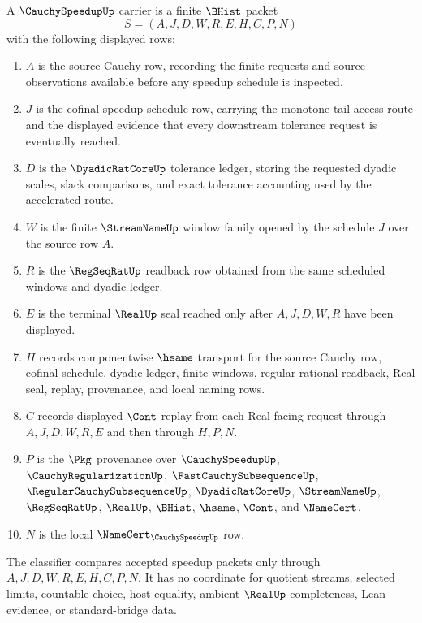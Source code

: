 \begin{definition}
\label{def:cauchy-speedup-carrier}
A $\CauchySpeedupUp$ carrier is a finite $\BHist$ packet
$$
S=(A,J,D,W,R,E,H,C,P,N)
$$
with the following displayed rows:
\begin{enumerate}
\item $A$ is the source Cauchy row, recording the finite requests and source observations available before any speedup schedule is inspected.
\item $J$ is the cofinal speedup schedule row, carrying the monotone tail-access route and the displayed evidence that every downstream tolerance request is eventually reached.
\item $D$ is the $\DyadicRatCoreUp$ tolerance ledger, storing the requested dyadic scales, slack comparisons, and exact tolerance accounting used by the accelerated route.
\item $W$ is the finite $\StreamNameUp$ window family opened by the schedule $J$ over the source row $A$.
\item $R$ is the $\RegSeqRatUp$ readback row obtained from the same scheduled windows and dyadic ledger.
\item $E$ is the terminal $\RealUp$ seal reached only after $A,J,D,W,R$ have been displayed.
\item $H$ records componentwise $\hsame$ transport for the source Cauchy row, cofinal schedule, dyadic ledger, finite windows, regular rational readback, Real seal, replay, provenance, and local naming rows.
\item $C$ records displayed $\Cont$ replay from each Real-facing request through $A,J,D,W,R,E$ and then through $H,P,N$.
\item $P$ is the $\Pkg$ provenance over $\CauchySpeedupUp$, $\CauchyRegularizationUp$, $\FastCauchySubsequenceUp$, $\RegularCauchySubsequenceUp$, $\DyadicRatCoreUp$, $\StreamNameUp$, $\RegSeqRatUp$, $\RealUp$, $\BHist$, $\hsame$, $\Cont$, and $\NameCert$.
\item $N$ is the local $\NameCert_{\CauchySpeedupUp}$ row.
\end{enumerate}
The classifier compares accepted speedup packets only through $A,J,D,W,R,E,H,C,P,N$. It has no coordinate for quotient streams, selected limits, countable choice, host equality, ambient $\RealUp$ completeness, Lean evidence, or standard-bridge data.
\end{definition}

